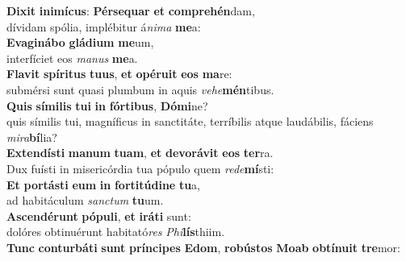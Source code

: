 \oddverse \textbf{Di}\textbf{xit} \textbf{i}\textbf{ni}\textbf{mí}\textbf{cus}: \textbf{Pér}\textbf{se}\textbf{quar} \textbf{et} \textbf{com}\textbf{pre}\textbf{hén}dam,~\*\\
\oddverse dívidam spólia, implébitur á\textit{ni}\textit{ma} \textbf{me}a:\\
\evenverse \textbf{E}\textbf{va}\textbf{gi}\textbf{ná}\textbf{bo} \textbf{glá}\textbf{di}\textbf{um} \textbf{me}um,~\*\\
\evenverse interfíciet eos \textit{ma}\textit{nus} \textbf{me}a.\\
\oddverse \textbf{Fla}\textbf{vit} \textbf{spí}\textbf{ri}\textbf{tus} \textbf{tu}\textbf{us}, \textbf{et} \textbf{o}\textbf{pé}\textbf{ru}\textbf{it} \textbf{e}\textbf{os} \textbf{ma}re:~\*\\
\oddverse submérsi sunt quasi plumbum in aquis \textit{ve}\textit{he}\textbf{mén}tibus.\\
\evenverse \textbf{Quis} \textbf{sí}\textbf{mi}\textbf{lis} \textbf{tu}\textbf{i} \textbf{in} \textbf{fór}\textbf{ti}\textbf{bus}, \textbf{Dó}\textbf{mi}ne?~\*\\
\evenverse quis símilis tui, magníficus in sanctitáte, terríbilis atque laudábilis, fáciens \textit{mi}\textit{ra}\textbf{bí}lia?\\
\oddverse \textbf{Ex}\textbf{ten}\textbf{dí}\textbf{sti} \textbf{ma}\textbf{num} \textbf{tu}\textbf{am}, \textbf{et} \textbf{de}\textbf{vo}\textbf{rá}\textbf{vit} \textbf{e}\textbf{os} \textbf{ter}ra.~\*\\
\oddverse Dux fuísti in misericórdia tua pópulo quem \textit{re}\textit{de}\textbf{mí}sti:\\
\evenverse \textbf{Et} \textbf{por}\textbf{tá}\textbf{sti} \textbf{e}\textbf{um} \textbf{in} \textbf{for}\textbf{ti}\textbf{tú}\textbf{di}\textbf{ne} \textbf{tu}a,~\*\\
\evenverse ad habitáculum \textit{san}\textit{ctum} \textbf{tu}um.\\
\oddverse \textbf{A}\textbf{scen}\textbf{dé}\textbf{runt} \textbf{pó}\textbf{pu}\textbf{li}, \textbf{et} \textbf{i}\textbf{rá}\textbf{ti} sunt:~\*\\
\oddverse dolóres obtinuérunt habitató\textit{res} \textit{Phi}\textbf{lís}thiim.\\
\evenverse \textbf{Tunc} \textbf{con}\textbf{tur}\textbf{bá}\textbf{ti} \textbf{sunt} \textbf{prín}\textbf{ci}\textbf{pes} \textbf{E}\textbf{dom}, \textbf{ro}\textbf{bú}\textbf{stos} \textbf{Mo}\textbf{ab} \textbf{ob}\textbf{tí}\textbf{nu}\textbf{it} \textbf{tre}mor:~\*\\
